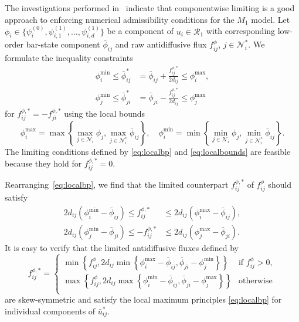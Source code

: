 \documentclass[preprint, 11pt]{elsarticle}
\newcommand{\N}{\mathcal{N}}
\newcommand{\pz}{\psi^{(0)}}
\begin{document}
The investigations performed in~\cite{chidyagwai2018, dzanic2025} indicate that componentwise limiting is a good approach to enforcing numerical admissibility conditions for the $M_1$ model.
Let $\phi_i\in\{\pz_i, \psi_{i,1}^{(1)},\ldots,  \psi_{i,d}^{(1)}\}$ be a component of $u_i\in \mathcal{R}_1$ with corresponding low-order bar-state component $\bar\phi_{ij}$ and raw antidiffusive flux $f_{ij}^{\phi}$, $j\in\N_i^*$.
We formulate the inequality constraints
\begin{equation}\label{eq:localbp}
  \begin{split}
    \phi_i^{\min}\leq\bar\phi_{ij}^* &= \bar\phi_{ij} +\frac{f_{ij}^{\phi,*}}{2d_{ij}} \leq \phi_i^{\max},\\
      \phi_j^{\min}\leq\bar\phi_{ji}^* &= \bar\phi_{ji} -\frac{f_{ij}^{\phi,*}}{2d_{ij}} \leq \phi_j^{\max}
    \end{split}
\end{equation}
for $f_{ij}^{\phi,*}=-f_{ji}^{\phi,*}$
using the local bounds
\begin{equation}\label{eq:localbounds}
    \phi_i^{\max} = \max\left\{ \max_{j\in\N_i} \phi_j, \max_{j\in\N_i^*} \bar\phi_{ij} \right\},\quad
    \phi_i^{\min} = \min\left\{ \min_{j\in\N_i} \phi_j, \min_{j\in\N_i^*} \bar\phi_{ij} \right\}.
\end{equation}
The limiting conditions defined by \eqref{eq:localbp}
and \eqref{eq:localbounds} are feasible
because they hold for $f_{ij}^{\phi,*} = 0$.

Rearranging~\eqref{eq:localbp}, we find that the limited counterpart
$f_{ij}^{\phi,*}$ of $f_{ij}^{\phi}$ should satisfy
\begin{equation}\label{eq:fluxbounds}
  \begin{split}
    2d_{ij}\left(\phi_i^{\min} -\bar\phi_{ij}\right)\leq f_{ij}^{\phi,*}&\leq 2d_{ij}\left( \phi_i^{\max} -\bar\phi_{ij}\right),\\
    2d_{ij}\left(\phi_j^{\min}-\bar\phi_{ji}
    \right)\leq -f_{ij}^{\phi,*}&\leq 2d_{ij}
    \left(\phi_j^{\max}-\bar\phi_{ji} \right).
    \end{split}
\end{equation}
It is easy to verify that the limited antidiffusive fluxes defined
by~\cite{kuzmin2020, kuzmin2023}
\begin{equation}\label{eq:limitedfluxes}
    f_{ij}^{\phi,*}=\begin{cases}
        \min\left\{f_{ij}^\phi, 2d_{ij}\min \left\{\phi_i^{\max} -\bar\phi_{ij}, \bar\phi_{ji} -\phi_j^{\min}\right\}\right\}&\text{if }f_{ij}^\phi>0,\\
        \max\left\{f_{ij}^\phi, 2d_{ij}\max \left\{\phi_i^{\min} -\bar\phi_{ij}, \bar\phi_{ji} -\phi_j^{\max}\right\}\right\}&\text{otherwise}\\
    \end{cases}
\end{equation}
are skew-symmetric and
satisfy the local maximum principles
\eqref{eq:localbp} for individual components
of $\bar u_{ij}^*$.
\end{document}
